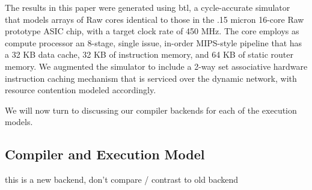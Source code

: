 The results in this paper were generated using btl, a cycle-accurate
simulator that models arrays of Raw cores identical to those in the
.15 micron 16-core Raw prototype ASIC chip, with a target clock rate
of 450 MHz. The core employs as compute processor an 8-stage, single
issue, in-order MIPS-style pipeline that has a 32 KB data cache, 32 KB
of instruction memory, and 64 KB of static router memory.  We
augmented the simulator to include a 2-way set associative hardware
instruction caching mechanism that is serviced over the dynamic
network, with resource contention modeled accordingly. 

We will now turn to discussing our compiler backends for each of the
execution models.





\subsection{Compiler and Execution Model}
this is a new backend, don't compare / contrast to old backend

